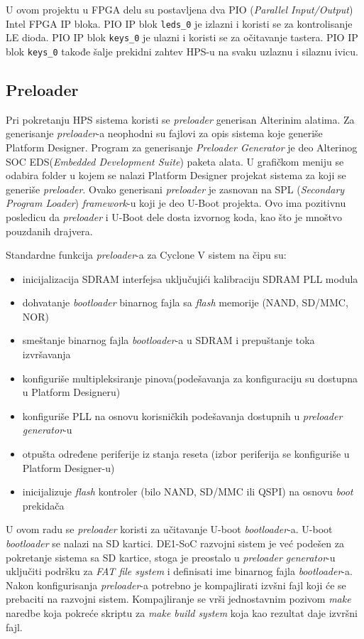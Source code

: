 U ovom projektu u FPGA delu su postavljena dva PIO (\textit{Parallel Input/Output}) Intel FPGA IP bloka. PIO IP blok \texttt{leds\_0} je izlazni i koristi se za kontrolisanje LE dioda. PIO IP blok \texttt{keys\_0} je ulazni i koristi se za očitavanje tastera. PIO IP blok \texttt{keys\_0} takođe šalje prekidni zahtev HPS-u na svaku uzlaznu i silaznu ivicu.

\subsection{Preloader}
Pri pokretanju HPS sistema koristi se \textit{preloader} generisan Alterinim alatima. Za generisanje \textit{preloader}-a neophodni su fajlovi za opis sistema koje generiše Platform Designer. Program za generisanje \textit{Preloader Generator} je deo Alterinog SOC EDS(\textit{Embedded Development Suite}) paketa alata. U grafičkom meniju se odabira folder u kojem se nalazi Platform Designer projekat sistema za koji se generiše \textit{preloader}. Ovako generisani \textit{preloader} je zasnovan na SPL (\textit{Secondary Program Loader}) \textit{framework}-u koji je deo U-Boot projekta. Ovo ima pozitivnu posledicu da \textit{preloader} i U-Boot dele dosta izvornog koda, kao što je mnoštvo pouzdanih drajvera.

Standardne funkcija \textit{preloader}-a za Cyclone V sistem na čipu su:
\begin{itemize}
\item inicijalizacija SDRAM interfejsa uključujići kalibraciju SDRAM PLL modula
\item dohvatanje \textit{bootloader} binarnog fajla sa \textit{flash} memorije (NAND, SD/MMC, NOR)
\item smeštanje binarnog fajla \textit{bootloader}-a u SDRAM i prepuštanje toka izvršavanja
\item konfiguriše multipleksiranje pinova(podešavanja za konfiguraciju su dostupna u Platform Designeru)
\item konfiguriše PLL na osnovu korisničkih podešavanja dostupnih u \textit{preloader generator}-u
\item otpušta određene periferije iz stanja reseta (izbor periferija se konfiguriše u Platform Designer-u)
\item inicijalizuje \textit{flash} kontroler (bilo NAND, SD/MMC ili QSPI) na osnovu \textit{boot} prekidača
\end{itemize}

U ovom radu se \textit{preloader} koristi za učitavanje U-boot \textit{bootloader}-a. U-boot \textit{bootloader} se nalazi na SD kartici. DE1-SoC razvojni sistem je već podešen za pokretanje sistema sa SD kartice, stoga je preostalo u \textit{preloader generator}-u uključiti podršku za \textit{FAT file system} i definisati ime binarnog fajla \textit{bootloader}-a. Nakon konfigurisanja \textit{preloader}-a potrebno je kompajlirati izvšni fajl koji će se prebaciti na razvojni sistem. Kompajliranje se vrši jednostavnim pozivom \textit{make} naredbe koja pokreće skriptu za \textit{make build system} koja kao rezultat daje izvršni fajl.

